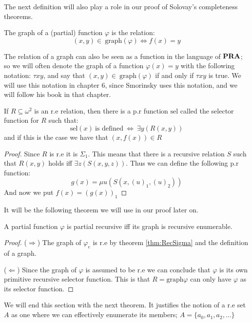 \documentclass[../main.tex]{subfiles}
\begin{document}
The next definition will also play a role in our proof of Solovay's
completeness theorems.

\begin{defi}
	The graph of a (partial) function $\varphi$ is the relation:
	\[(x,y)\in\ \text{graph} (\varphi)\Leftrightarrow f(x)=y\]
\end{defi}
The relation of a graph can also be seen as a function in the language of
$\text{\textbf{PRA}}$; so we will often denote the graph of a function $\varphi(x)=y$ with the
following notation: $\tau xy$, and say that $(x,y)\in\ \text{graph}(\varphi)$ if and
only if $\tau xy$ is true. We will use this notation in chapter 6, since Smorinsky
uses this notation, and we will follow his book \parencite{Smor1985} in that
chapter.

\begin{thm}
	If $R\subseteq\omega^2$ is an r.e relation, then there is a p.r
	function $\text{sel}$ called the selector function for $R$ such that:
	$$\text{sel}(x)\ \text{is defined}\ \Leftrightarrow\ \exists y(R(x,y))$$
	and if this is the case we have that $(x,f(x))\in R$
\end{thm}
\begin{proof}
	Since $R$ is r.e it is $\Sigma_1$. This means that there is a recursive
	relation $S$ such that $R(x,y)$ holds iff $\exists z (S(x,y,z))$. Thus
	we can define the following p.r function:
	$$g(x)=\mu u(S(x,(u)_1,(u)_2))$$
	And now we put $f(x)=(g(x))_1$
\end{proof}
It will be the following theorem we will use in our proof later on.
\begin{thm}
	A partial function $\varphi$ is partial recursive iff its graph is recursive
	enumerable.
\end{thm}
\begin{proof}
	($\Rightarrow$) The graph of $\varphi_e$ is r.e by theorem \ref{thm:RecSigma} and the
	definition of a graph.

	($\Leftarrow$) Since the graph of $\varphi$ is assumed to be r.e we can
	conclude that $\varphi$ is its own primitive recursive selector function. This
	is that $R=\text{graph} \varphi$ can only have $\varphi$ as its selector function.
\end{proof}

We will end this section with the next theorem. It justifies the notion of a
r.e set $A$ as one where we can effectively enumerate its members;
$A=\{a_0,a_1,a_2,\ldots\}$
\end{document}
